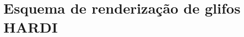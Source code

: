 \documentclass[
    12pt,                %
    oneside,            %
    a4paper,            %
    english,            %
    french,                %
    spanish,            %
    brazil                %
    ]{abntex2}
\begin{document}





\section{Esquema de renderização de glifos HARDI}




\end{document}
